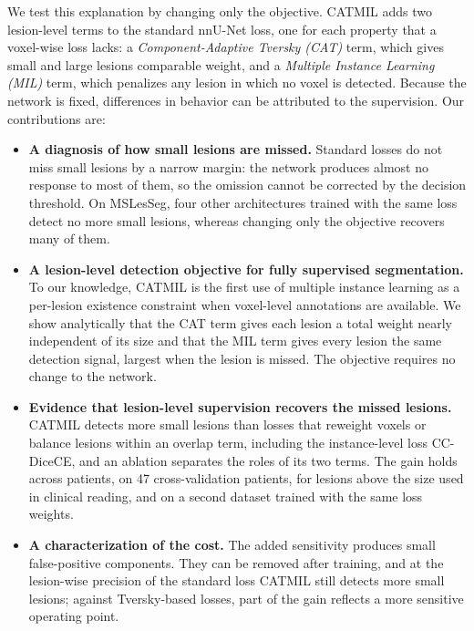 We test this explanation by changing only the objective. CATMIL adds two
lesion-level terms to the standard nnU-Net loss, one for each property
that a voxel-wise loss lacks: a \emph{Component-Adaptive Tversky (CAT)}
term, which gives small and large lesions comparable weight, and a
\emph{Multiple Instance Learning (MIL)} term, which penalizes any lesion in
which no voxel is detected. Because the network is fixed, differences in
behavior can be attributed to the supervision. Our contributions are:
\begin{itemize}
\item \textbf{A diagnosis of how small lesions are missed.} Standard losses
do not miss small lesions by a narrow margin: the network produces almost
no response to most of them, so the omission cannot be corrected by the
decision threshold. On MSLesSeg, four other architectures trained with the
same loss detect no more small lesions, whereas changing only the
objective recovers many of them.
\item \textbf{A lesion-level detection objective for fully supervised
segmentation.} To our knowledge, CATMIL is the first use of multiple
instance learning as a per-lesion existence constraint when voxel-level
annotations are available. We show analytically that the CAT term gives
each lesion a total weight nearly independent of its size and that the MIL
term gives every lesion the same detection signal, largest when the lesion
is missed. The objective requires no change to the network.
\item \textbf{Evidence that lesion-level supervision recovers the missed
lesions.} CATMIL detects more small lesions than losses that reweight
voxels or balance lesions within an overlap term, including the
instance-level loss CC-DiceCE, and an ablation separates the roles of its
two terms. The gain holds across patients, on 47
cross-validation patients, for lesions above the size used in clinical
reading, and on a second dataset trained with the same loss weights.
\item \textbf{A characterization of the cost.} The added sensitivity
produces small false-positive components. They can be removed after
training, and at the lesion-wise precision of the standard loss CATMIL
still detects more small lesions; against Tversky-based losses, part of
the gain reflects a more sensitive operating point.
\end{itemize}

